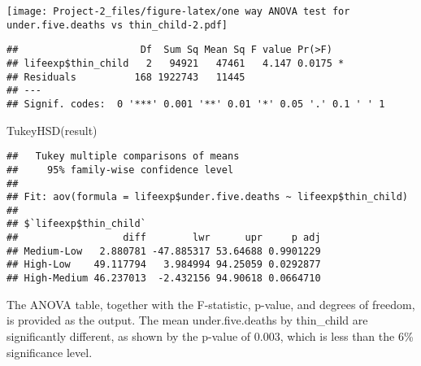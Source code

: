 \documentclass[
]{article}
\newenvironment{Shaded}{\begin{snugshade}}{\end{snugshade}}
\newcommand{\CommentTok}[1]{\textcolor[rgb]{0.56,0.35,0.01}{\textit{#1}}}
\newcommand{\FunctionTok}[1]{\textcolor[rgb]{0.00,0.00,0.00}{#1}}
\newcommand{\NormalTok}[1]{#1}
\newcommand{\OtherTok}[1]{\textcolor[rgb]{0.56,0.35,0.01}{#1}}
\newcommand{\SpecialCharTok}[1]{\textcolor[rgb]{0.00,0.00,0.00}{#1}}
\begin{document}
\begin{Shaded}
\end{Shaded}

\texttt{[image: Project-2\_files/figure-latex/one way ANOVA test for under.five.deaths vs thin\_child-2.pdf]}

\begin{Shaded}
\end{Shaded}

\begin{verbatim}
##                     Df  Sum Sq Mean Sq F value Pr(>F)  
## lifeexp$thin_child   2   94921   47461   4.147 0.0175 *
## Residuals          168 1922743   11445                 
## ---
## Signif. codes:  0 '***' 0.001 '**' 0.01 '*' 0.05 '.' 0.1 ' ' 1
\end{verbatim}

\begin{Shaded}
\begin{Highlighting}[]
\FunctionTok{TukeyHSD}\NormalTok{(result)}
\end{Highlighting}
\end{Shaded}

\begin{verbatim}
##   Tukey multiple comparisons of means
##     95% family-wise confidence level
## 
## Fit: aov(formula = lifeexp$under.five.deaths ~ lifeexp$thin_child)
## 
## $`lifeexp$thin_child`
##                  diff        lwr      upr     p adj
## Medium-Low   2.880781 -47.885317 53.64688 0.9901229
## High-Low    49.117794   3.984994 94.25059 0.0292877
## High-Medium 46.237013  -2.432156 94.90618 0.0664710
\end{verbatim}

The ANOVA table, together with the F-statistic, p-value, and degrees of
freedom, is provided as the output. The mean under.five.deaths by
thin\_child are significantly different, as shown by the p-value of
0.003, which is less than the 6\% significance level.
\end{document}
